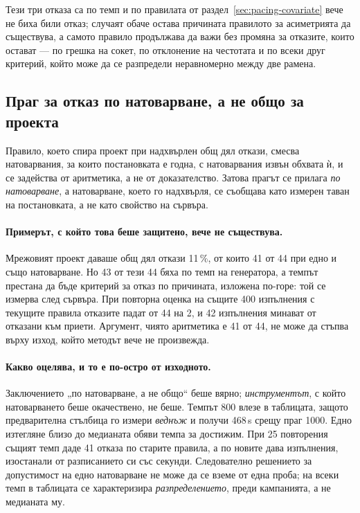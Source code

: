 Тези три отказа са по темп и по правилата от раздел~\ref{sec:pacing-covariate} вече не биха били
отказ; случаят обаче остава причината правилото за асиметрията да съществува, а самото правило
продължава да важи без промяна за отказите, които остават — по грешка на сокет, по отклонение на
честотата и по всеки друг критерий, който може да се разпредели неравномерно между две рамена.

\subsection{Праг за отказ по натоварване, а не общо за проекта}

Правило, което спира проект при надхвърлен общ дял откази, смесва натоварвания, за които
постановката е годна, с натоварвания извън обхвата ѝ, и се задейства от аритметика, а не от
доказателство. Затова прагът се прилага \emph{по натоварване}, а натоварване, което го надхвърля, се
съобщава като измерен таван на постановката, а не като свойство на сървъра.

\paragraph{Примерът, с който това беше защитено, вече не съществува.} Мрежовият проект даваше общ
дял откази 11\,\%, от които 41 от 44 при едно и също натоварване. Но 43 от тези 44 бяха по темп на
генератора, а темпът престана да бъде критерий за отказ по причината, изложена по-горе: той се
измерва след сървъра. При повторна оценка на същите 400 изпълнения с текущите правила отказите падат
от 44 на 2, и 42 изпълнения минават от отказани към приети. Аргумент, чиято аритметика е 41 от 44,
не може да стъпва върху изход, който методът вече не произвежда.

\paragraph{Какво оцелява, и то е по-остро от изходното.} Заключението „по натоварване, а не общо“
беше вярно; \emph{инструментът}, с който натоварването беше окачествено, не беше. Темпът 800 влезе в
таблицата, защото предварителна стълбица го измери \emph{веднъж} и получи 468\,\textmu s срещу праг
1000. Едно изтегляне близо до медианата обяви темпа за достижим. При 25 повторения същият темп даде
41 отказа по старите правила, а по новите дава изпълнения, изостанали от разписанието си със секунди.
Следователно решението за допустимост на едно натоварване не може да се вземе от една проба; на всеки
темп в таблицата се характеризира \emph{разпределението}, преди кампанията, а не медианата му.

